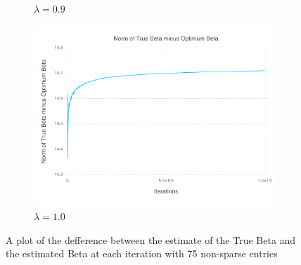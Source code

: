 \documentclass[12pt, leqno]{article}
\begin{document}
\begin{figure}
\begin{subfigure}[b]{0.4\textwidth}
                \caption{$\lambda = 0.9$}
                \label{}
        \end{subfigure}
        \begin{subfigure}[b]{0.4\textwidth}
                \includegraphics[width=\textwidth]{trueerrorplot10-75.pdf}
                \caption{$\lambda = 1.0$}
                \label{}
        \end{subfigure}%
        \caption{A plot of the defference between the estimate of the
          True Beta and the estimated Beta at each iteration with 75 non-sparse entries}\label{fig:trueerrors}
\end{figure}
\end{document}

